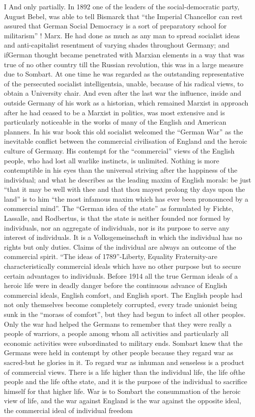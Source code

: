 \documentclass[11pt,openany]{book}
\begin{document}
I And only partially. In 1892 one of the leaders of the social-democratic party, August Bebel, was able to tell Bismarck that ``the Imperial Chancellor can rest assured that German Social Democracy is a sort of preparatory school for militarism'' ! Marx. He had done as much as any man to spread socialist ideas and anti-capitalist resentment of varying shades throughout Germany; and ifGerman thought became penetrated with Marxian elements in a way that was true of no other country till the Russian revolution, this was in a large measure due to Sombart. At one time he was regarded as the outstanding representative of the persecuted socialist intelligentsia, unable, because of his radical views, to obtain a University chair. And even after the last war the influence, inside and outside Germany of his work as a historian, which remained Marxist in approach after he had ceased to be a Marxist in politics, was most extensive and is particularly noticeable in the works of many of the English and American planners. In his war book this old socialist welcomed the ``German War'' as the inevitable conflict between the commercial civilisation of England and the heroic culture of Germany. His contempt for the ``commercial'' views of the English people, who had lost all warlike instincts, is unlimited. Nothing is more contemptible in his eyes than the universal striving after the happiness of the individual; and what he describes as the leading maxim of English morals: be just ``that it may be well with thee and that thou mayest prolong thy days upon the land'' is to him ``the most infamous maxim which has ever been pronounced by a commercial mind''. The ``German idea of the state'' as formulated by Fichte, Lassalle, and Rodbertus, is that the state is neither founded nor formed by individuals, nor an aggregate of individuals, nor is its purpose to serve any interest of individuals. It is a Volksgemeinschaft in which the individual has no rights but only duties. Claims of the individual are always an outcome of the commercial spirit. ``The ideas of 1789''-Liberty, Equality Fraternity-are characteristically commercial ideals which have no other purpose but to secure certain advantages to individuals. Before 1914 all the true German ideals of a heroic life were in deadly danger before the continuous advance of English commercial ideals, English comfort, and English sport. The English people had not only themselves become completely corrupted, every trade unionist being sunk in the ``morass of comfort'', but they had begun to infect all other peoples. Only the war had helped the Germans to remember that they were really a people of warriors, a people among whom all activities and particularly all economic activities were subordinated to military ends. Sombart knew that the Germans were held in contempt by other people because they regard war as sacred-but he glories in it. To regard war as inhuman and senseless is a product of commercial views. There is a life higher than the individual life, the life ofthe people and the life ofthe state, and it is the purpose of the individual to sacrifice himself for that higher life. War is to Sombart the consummation of the heroic view of life, and the war against England is the war against the opposite ideal, the commercial ideal of individual freedom 
\end{document}
